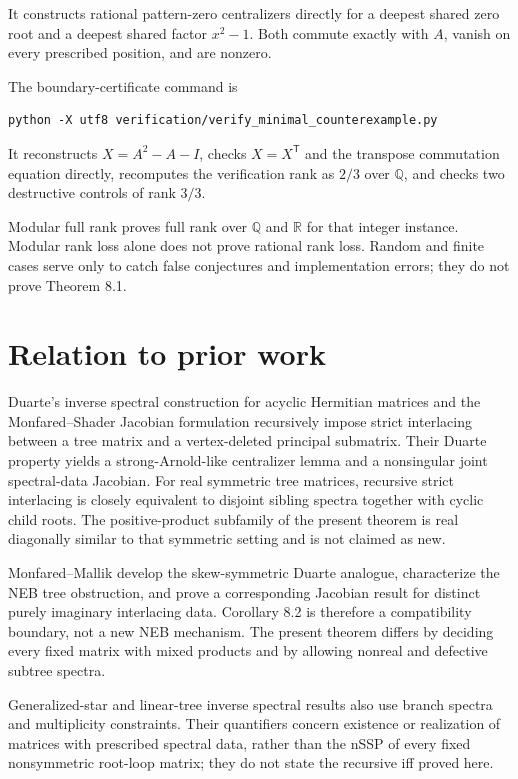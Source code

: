 \documentclass[11pt]{article}
\theoremstyle{remark}
\begin{document}
It constructs rational pattern-zero centralizers directly for a deepest shared zero root and a deepest shared factor $x^2-1$. Both commute exactly with $A$, vanish on every prescribed position, and are nonzero.

The boundary-certificate command is

\begin{Verbatim}[breaklines=true,breakanywhere=true,fontsize=\small]
python -X utf8 verification/verify_minimal_counterexample.py
\end{Verbatim}

It reconstructs $X=A^2-A-I$, checks $X=X^{\mathsf T}$ and the transpose commutation equation directly, recomputes the verification rank as $2/3$ over $\mathbb Q$, and checks two destructive controls of rank $3/3$.

Modular full rank proves full rank over $\mathbb Q$ and $\mathbb R$ for that integer instance. Modular rank loss alone does not prove rational rank loss. Random and finite cases serve only to catch false conjectures and implementation errors; they do not prove Theorem 8.1.

\section{Relation to prior work}


Duarte's inverse spectral construction for acyclic Hermitian matrices \cite{ref8} and the Monfared--Shader Jacobian formulation \cite{ref3} recursively impose strict interlacing between a tree matrix and a vertex-deleted principal submatrix. Their Duarte property yields a strong-Arnold-like centralizer lemma and a nonsingular joint spectral-data Jacobian. For real symmetric tree matrices, recursive strict interlacing is closely equivalent to disjoint sibling spectra together with cyclic child roots. The positive-product subfamily of the present theorem is real diagonally similar to that symmetric setting and is not claimed as new.

Monfared--Mallik \cite{ref4} develop the skew-symmetric Duarte analogue, characterize the NEB tree obstruction, and prove a corresponding Jacobian result for distinct purely imaginary interlacing data. Corollary 8.2 is therefore a compatibility boundary, not a new NEB mechanism. The present theorem differs by deciding every fixed matrix with mixed products and by allowing nonreal and defective subtree spectra.

Generalized-star and linear-tree inverse spectral results \cite{ref13,ref14}
also use branch spectra and multiplicity constraints.  Their quantifiers concern
existence or realization of matrices with prescribed spectral data, rather
than the nSSP of every fixed nonsymmetric root-loop matrix; they do not state
the recursive iff proved here.
\end{document}
